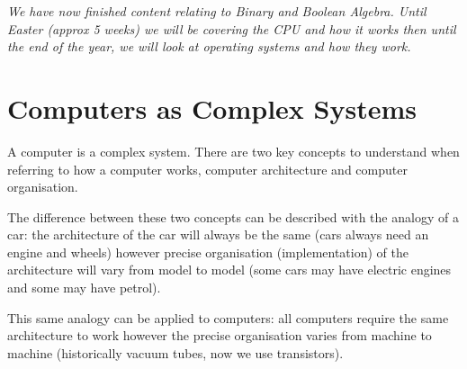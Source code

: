 
\textit{We have now finished content relating to Binary and Boolean Algebra. Until Easter (approx 5 weeks) we will be covering the CPU and how it works then until the end of the year, we will look at operating systems and how they work.}

\section{Computers as Complex Systems}
A computer is a complex system. There are two key concepts to understand when referring to how a computer works, computer architecture and computer organisation.

The difference between these two concepts can be described with the analogy of a car: the architecture of the car will always be the same (cars always need an engine and wheels) however precise organisation (implementation) of the architecture will vary from model to model (some cars may have electric engines and some may have petrol).

This same analogy can be applied to computers: all computers require the same architecture to work however the precise organisation varies from machine to machine (historically vacuum tubes, now we use transistors).


